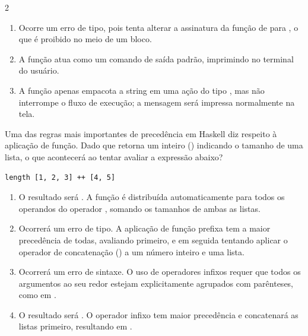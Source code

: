 \documentclass[a4paper,10pt,brazil]{article}
\begin{document}
\begin{multicols}{2}
\begin{enumerate}
  \item Ocorre um erro de tipo, pois  tenta alterar a assinatura da função de  para , o que é proibido no meio de um bloco.

  \item A função  atua como um comando de saída padrão, imprimindo  no terminal do usuário.

  \item A função  apenas empacota a string em uma ação do tipo , mas não interrompe o fluxo de execução; a mensagem  será impressa normalmente na tela.


\end{enumerate}

Uma das regras mais importantes de precedência em Haskell diz respeito à aplicação de função. Dado que  retorna um inteiro () indicando o tamanho de uma lista, o que acontecerá ao tentar avaliar a expressão abaixo?
\begin{verbatim}
length [1, 2, 3] ++ [4, 5]
\end{verbatim}

\begin{enumerate}
  \item O resultado será . A função  é distribuída automaticamente para todos os operandos do operador \haskellinline{++}, somando os tamanhos de ambas as listas.

  \item Ocorrerá um erro de tipo. A aplicação de função prefixa tem a maior precedência de todas, avaliando  primeiro, e em seguida tentando aplicar o operador de concatenação (\haskellinline{++}) a um número inteiro e uma lista.

  \item Ocorrerá um erro de sintaxe. O uso de operadores infixos requer que todos os argumentos ao seu redor estejam explicitamente agrupados com parênteses, como em .

  \item O resultado será . O operador infixo \haskellinline{++} tem maior precedência e concatenará as listas primeiro, resultando em .


\end{enumerate}
\end{multicols}
\end{document}
